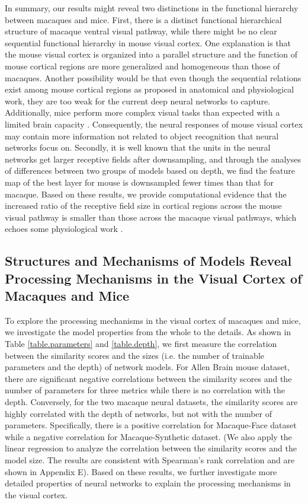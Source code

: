 \documentclass[letterpaper]{article} %
\begin{document}
In summary, our results might reveal two distinctions in the functional hierarchy between macaques and mice. First, there is a distinct functional hierarchical structure of macaque ventral visual pathway, while there might be no clear sequential functional hierarchy in mouse visual cortex. One explanation is that the mouse visual cortex is organized into a parallel structure and the function of mouse cortical regions are more generalized and homogeneous than those of macaques. Another possibility would be that even though the sequential relations exist among mouse cortical regions as proposed in anatomical and physiological work, they are too weak for the current deep neural networks to capture. Additionally, mice perform more complex visual tasks than expected with a limited brain capacity \cite{djurdjevic2018accuracy}. Consequently, the neural responses of mouse visual cortex may contain more information not related to object recognition that neural networks focus on. Secondly, it is well known that the units in the neural networks get larger receptive fields after downsampling, and through the analyses of differences between two groups of models based on depth, we find the feature map of the best layer for mouse is downsampled fewer times than that for macaque. Based on these results, we provide computational evidence that the increased ratio of the receptive field size in cortical regions across the mouse visual pathway is smaller than those across the macaque visual pathways, which echoes some physiological work \cite{siegle2021survey, zhu2013multi}.

\subsection{Structures and Mechanisms of Models Reveal Processing Mechanisms in the Visual Cortex of Macaques and Mice}

To explore the processing mechanisms in the visual cortex of macaques and mice, we investigate the model properties from the whole to the details. As shown in Table \ref{table.parameters} and \ref{table.depth}, we first measure the correlation between the similarity scores and the sizes (i.e. the number of trainable parameters and the depth) of network models. For Allen Brain mouse dataset, there are significant negative correlations between the similarity scores and the number of parameters for three metrics while there is no correlation with the depth. Conversely, for the two macaque neural datasets, the similarity scores are highly correlated with the depth of networks, but not with the number of parameters. Specifically, there is a positive correlation for Macaque-Face dataset while a negative correlation for Macaque-Synthetic dataset. (We also apply the linear regression to analyze the correlation between the similarity scores and the model size. The results are consistent with Spearman's rank correlation and are shown in Appendix E). Based on these results, we further investigate more detailed properties of neural networks to explain the processing mechanisms in the visual cortex.
\end{document}

